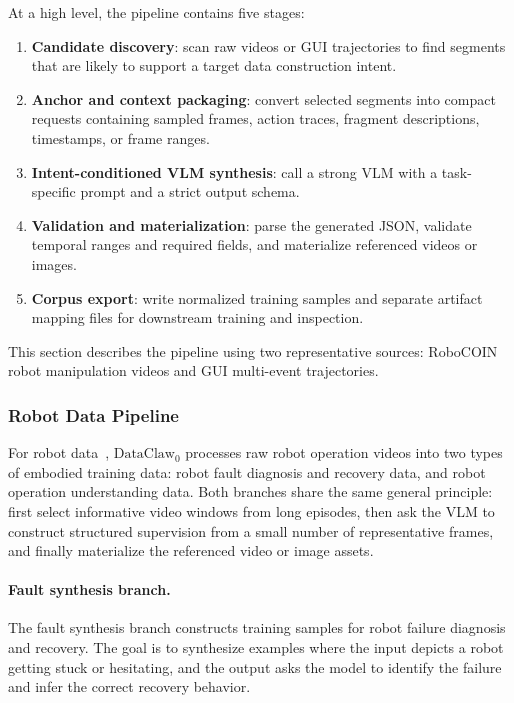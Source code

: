 At a high level, the pipeline contains five stages:
\begin{enumerate}
    \item \textbf{Candidate discovery}: scan raw videos or GUI trajectories to find segments that are likely to support a target data construction intent.
    \item \textbf{Anchor and context packaging}: convert selected segments into compact requests containing sampled frames, action traces, fragment descriptions, timestamps, or frame ranges.
    \item \textbf{Intent-conditioned VLM synthesis}: call a strong VLM with a task-specific prompt and a strict output schema.
    \item \textbf{Validation and materialization}: parse the generated JSON, validate temporal ranges and required fields, and materialize referenced videos or images.
    \item \textbf{Corpus export}: write normalized training samples and separate artifact mapping files for downstream training and inspection.
\end{enumerate}

This section describes the pipeline using two representative sources: RoboCOIN robot manipulation videos and GUI multi-event trajectories.

\subsubsection{Robot Data Pipeline}
\label{app:robocoin_pipeline}

For robot data~\cite{agibot,robocoin}, $\text{DataClaw}_0$ processes raw robot operation videos into two types of embodied training data: robot fault diagnosis and recovery data, and robot operation understanding data. Both branches share the same general principle: first select informative video windows from long episodes, then ask the VLM to construct structured supervision from a small number of representative frames, and finally materialize the referenced video or image assets.

\paragraph{Fault synthesis branch.}
The fault synthesis branch constructs training samples for robot failure diagnosis and recovery. The goal is to synthesize examples where the input depicts a robot getting stuck or hesitating, and the output asks the model to identify the failure and infer the correct recovery behavior.

